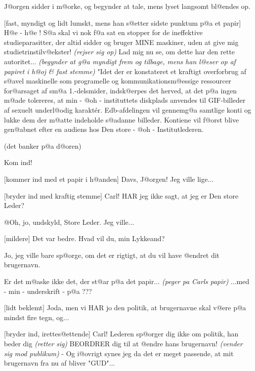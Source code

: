 \documentclass[a4paper,11pt]{article}
\begin{document}
\begin{sketch}

\scene J@orgen sidder i m@orke, og begynder at tale, mens lyset
langsomt bl@endes op.

[fast, myndigt og lidt lumskt, mens han s@etter sidste
punktum p@a et papir] H@e - h@e ! S@a skal vi nok f@a sat en stopper
for de ineffektive studieparasitter, der altid sidder og bruger MINE
maskiner, uden at give mig studietrinstilv@ekster! {\em (rejser sig
op)} Lad mig nu se, om dette har den rette autoritet...  {\em
(begynder at g@a myndigt frem og tilbage, mens han l@eser op af
papiret i h@oj \& fast stemme)} "Idet der er konstateret et kraftigt
overforbrug af s@avel maskinelle som programelle og
kommunikationsm@essige ressourcer for@arsaget af sm@a 1.-delsmider,
indsk@erpes det herved, at det p@a ingen m@ade tolereres, at min -
@oh - instituttets diskplads anvendes til GIF-billeder af sexuelt
underl@odig karakt\'er. Edb-afdelingen vil gennemg@a samtlige konti
og lukke dem der m@atte indeholde s@adanne billeder. Kontiene vil
f@orst blive gen@abnet efter en audiens hos Den store - @oh -
Institutlederen.

\scene (det banker p@a d@oren)

 Kom ind!

[kommer ind med et papir i h@anden] Davs, J@orgen! Jeg
ville lige...

[bryder ind med kraftig stemme] Carl! HAR jeg ikke
sagt, at jeg er Den store Leder?

 @Oh, jo, undskyld, Store Leder. Jeg ville...

[mildere] Det var bedre. Hvad vil du, min Lykkeand?

 Jo, jeg ville bare sp@orge, om det er rigtigt, at du vil
have @endret dit brugernavn.

 Er det m@aske ikke det, der st@ar p@a det papir... {\em
(peger pa Carls papir)} ...med - min - underskrift - p@a ???

[lidt beklemt] Joda, men vi HAR jo den politik, at
brugernavne skal v@ere p@a mindst fire tegn, og...

[bryder ind, irettes@ettende] Carl! Lederen sp@orger
dig ikke om politik, han beder dig {\em (retter sig)} BEORDRER dig til
at @endre hans brugernavn! {\em (vender sig mod publikum)} - Og
i@ovrigt synes jeg da det er meget passende, at mit brugernavn fra nu
af bliver "GUD"...


\end{sketch}
\end{document}
